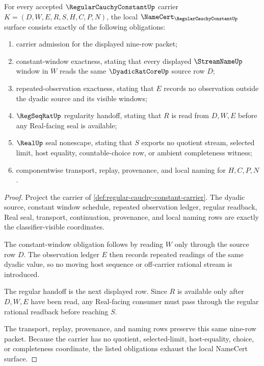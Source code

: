 \begin{theorem}
\label{thm:regular-cauchy-constant-namecert-obligations}
For every accepted $\RegularCauchyConstantUp$ carrier $K=(D,W,E,R,S,H,C,P,N)$, the local $\NameCert_{\RegularCauchyConstantUp}$ surface consists exactly of the following obligations:
\begin{enumerate}
\item carrier admission for the displayed nine-row packet;
\item constant-window exactness, stating that every displayed $\StreamNameUp$ window in $W$ reads the same $\DyadicRatCoreUp$ source row $D$;
\item repeated-observation exactness, stating that $E$ records no observation outside the dyadic source and its visible windows;
\item $\RegSeqRatUp$ regularity handoff, stating that $R$ is read from $D,W,E$ before any Real-facing seal is available;
\item $\RealUp$ seal nonescape, stating that $S$ exports no quotient stream, selected limit, host equality, countable-choice row, or ambient completeness witness;
\item componentwise transport, replay, provenance, and local naming for $H,C,P,N$.
\end{enumerate}
\end{theorem}
\begin{proof}
Project the carrier of \autoref{def:regular-cauchy-constant-carrier}. The dyadic source, constant window schedule, repeated observation ledger, regular readback, Real seal, transport, continuation, provenance, and local naming rows are exactly the classifier-visible coordinates.

The constant-window obligation follows by reading $W$ only through the source row $D$. The observation ledger $E$ then records repeated readings of the same dyadic value, so no moving host sequence or off-carrier rational stream is introduced.

The regular handoff is the next displayed row. Since $R$ is available only after $D,W,E$ have been read, any Real-facing consumer must pass through the regular rational readback before reaching $S$.

The transport, replay, provenance, and naming rows preserve this same nine-row packet. Because the carrier has no quotient, selected-limit, host-equality, choice, or completeness coordinate, the listed obligations exhaust the local NameCert surface.
\end{proof}

